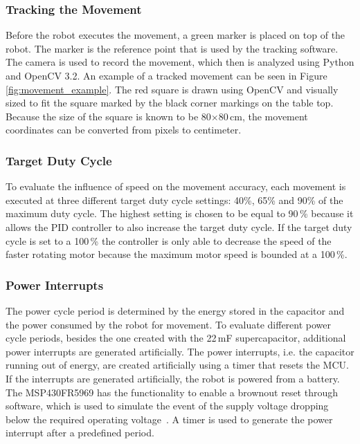 \subsubsection{Tracking the Movement}

Before the robot executes the movement, a green marker is placed on top of the robot.
The marker is the reference point that is used by the tracking software.
The camera is used to record the movement, which then is analyzed using Python and OpenCV 3.2.
An example of a tracked movement can be seen in Figure \ref{fig:movement_example}.
The red square is drawn using OpenCV and visually sized to fit the square marked by the black corner markings on the table top.
Because the size of the square is known to be 80$\times$80\,cm, the movement coordinates can be converted from pixels to centimeter.

\subsubsection{Target Duty Cycle}
To evaluate the influence of speed on the movement accuracy, each movement is executed at three different target duty cycle settings: 40\%, 65\% and 90\% of the maximum duty cycle.
The highest setting is chosen to be equal to 90\,\% because it allows the PID controller to also increase the target duty cycle.
If the target duty cycle is set to a 100\,\% the controller is only able to decrease the speed of the faster rotating motor because the maximum motor speed is bounded at a 100\,\%.


\subsubsection{Power Interrupts}

The power cycle period is determined by the energy stored in the capacitor and the power consumed by the robot for movement.
To evaluate different power cycle periods, besides the one created with the 22\,mF supercapacitor, additional power interrupts are generated artificially.
The power interrupts, i.e. the capacitor running out of energy, are created artificially using a timer that resets the MCU.
If the interrupts are generated artificially, the robot is powered from a battery.
The MSP430FR5969 has the functionality to enable a brownout reset through software, which is used to simulate the event of the supply voltage dropping below the required operating voltage~\cite{msp430fr_family_guide_2017}.
A timer is used to generate the power interrupt after a predefined period.

